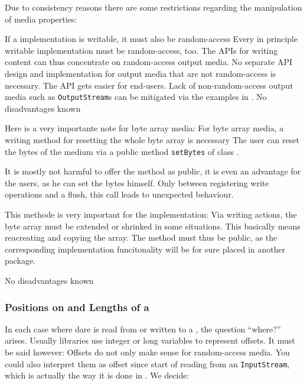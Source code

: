 Due to consistency reasons there are some restrictions regarding the manipulation of media properties:

{%
If a \IMedium{} implementation is writable, it must also be random-access
}
{%
Every in principle writable \IMedium{} implementation must be random-access, too. 
}
{%
The \LibName{} APIs for writing content can thus concentrate on random-access output media. No separate API design and implementation for output media that are not random-access is necessary. The API gets easier for end-users. Lack of non-random-access output media such as \texttt{OutputStream}s can be mitigated via the examples in .
}
{%
No disadvantages known
}

Here is a very importante note for byte array media:
{%
For byte array media, a writing method for resetting the whole byte array is necessary
}
{%
The user can reset the bytes of the medium via a public method \texttt{setBytes} of class \InMemoryMedium{}.
}
{%
It is mostly not harmful to offer the method as public, it is even an advantage for the users, as he can set the bytes himself. Only between registering write operations and a flush, this call leads to unexpected behaviour.

This methode is very important for the implementation: Via writing actions, the byte array must be extended or shrinked in some situations. This basically means reacreating and copying the array. The method must thus be public, as the corresponding implementation funcitonality will be for sure placed in another package.
}
{%
No disadvantages known
}


\subsubsection{Positions on and Lengths of a \TERMmedium{}}
\label{sec:PositiZugriffEinesTERMmedium}

In each case where dare is read from or written to a \TERMmedium{}, the question ``where?'' arises. Usually libraries use integer or long variables to represent offsets. It must be said however: Offsets do not only make sense for random-access media. You could also interpret them as offset since start of reading from an \texttt{InputStream}, which is actually the way it is done in \LibName{}. We decide:

